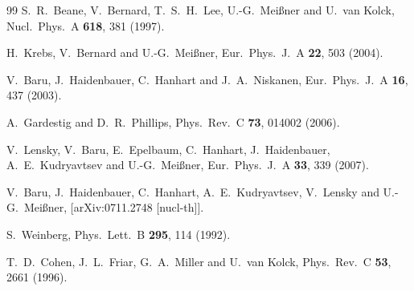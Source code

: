 \documentclass[aps,rmp,nofootinbib,twocolumn,floatfix]{revtex4}
\begin{document}
\begin{thebibliography}{99}
  S.~R.~Beane, V.~Bernard, T.~S.~H.~Lee, U.-G.~Mei{\ss}ner and U.~van Kolck,
  Nucl.\ Phys.\  A {\bf 618}, 381 (1997).

  H.~Krebs, V.~Bernard and U.-G.~Mei{\ss}ner,
  Eur.\ Phys.\ J.\  A {\bf 22}, 503 (2004).

  V.~Baru, J.~Haidenbauer, C.~Hanhart and J.~A.~Niskanen,
  Eur.\ Phys.\ J.\  A {\bf 16}, 437 (2003).

  A.~Gardestig and D.~R.~Phillips,
  Phys.\ Rev.\  C {\bf 73}, 014002 (2006).

  V.~Lensky, V.~Baru, E.~Epelbaum, C.~Hanhart, J.~Haidenbauer, A.~E.~Kudryavtsev and U.-G.~Mei{\ss}ner,
  Eur.\ Phys.\ J.\  A {\bf 33}, 339 (2007).

  V.~Baru, J.~Haidenbauer, C.~Hanhart, A.~E.~Kudryavtsev, V.~Lensky and U.-G.~Mei{\ss}ner,
  [arXiv:0711.2748 [nucl-th]].

  S.~Weinberg,
  Phys.\ Lett.\  B {\bf 295}, 114 (1992).

  T.~D.~Cohen, J.~L.~Friar, G.~A.~Miller and U.~van Kolck,
  Phys.\ Rev.\  C {\bf 53}, 2661 (1996).


\end{thebibliography}
\end{document}
